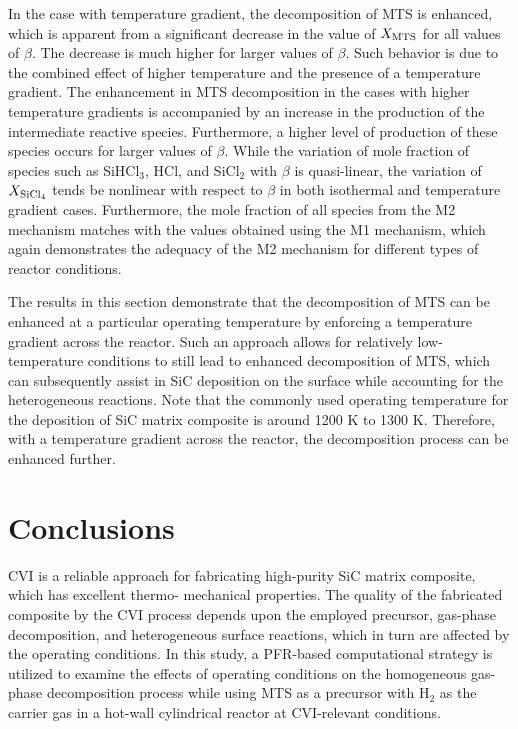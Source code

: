 \documentclass[final, letterpaper, square, comma, numbers, sort&compress]{elsarticle}
\begin{document}
In the case with temperature gradient, the decomposition of MTS is enhanced, which is apparent from a significant decrease in the value of $X_{\rm MTS}$ for all values of $\beta$. The decrease is much higher for larger values of $\beta$. Such behavior is due to the combined effect of higher temperature and the presence of a temperature gradient. The enhancement in MTS decomposition in the cases with higher temperature gradients is accompanied by an increase in the production of the intermediate reactive species. Furthermore, a higher level of production of these species occurs for larger values of $\beta$. While the variation of mole fraction of species such as SiHCl$_3$, HCl, and SiCl$_2$ with $\beta$ is quasi-linear, the variation of $X_{\rm SiCl_4}$ tends be nonlinear with respect to $\beta$ in both isothermal and temperature gradient cases. Furthermore, the mole fraction of all species from the M2 mechanism matches with the values obtained using the M1 mechanism, which again demonstrates the adequacy of the M2 mechanism for different types of reactor conditions.

The results in this section demonstrate that the decomposition of MTS can be enhanced at a particular operating temperature by enforcing a temperature gradient across the reactor. Such an approach allows for relatively low-temperature conditions to still lead to enhanced decomposition of MTS, which can subsequently assist in SiC deposition on the surface while accounting for the heterogeneous reactions. Note that the commonly used operating temperature for the deposition of SiC matrix composite is around 1200 K to 1300 K. Therefore, with a temperature gradient across the reactor, the decomposition process can be enhanced further.

\section{Conclusions}
\label{S:5}
CVI is a reliable approach for fabricating high-purity SiC matrix composite, which has excellent thermo- mechanical properties. The quality of the fabricated composite by the CVI process depends upon the employed precursor, gas-phase decomposition, and heterogeneous surface reactions, which in turn are affected by the operating conditions. In this study, a PFR-based computational strategy is utilized to examine the effects of operating conditions on the homogeneous gas-phase decomposition process while using MTS as a precursor with H$_2$ as the carrier gas in a hot-wall cylindrical reactor at CVI-relevant conditions.
\end{document}
